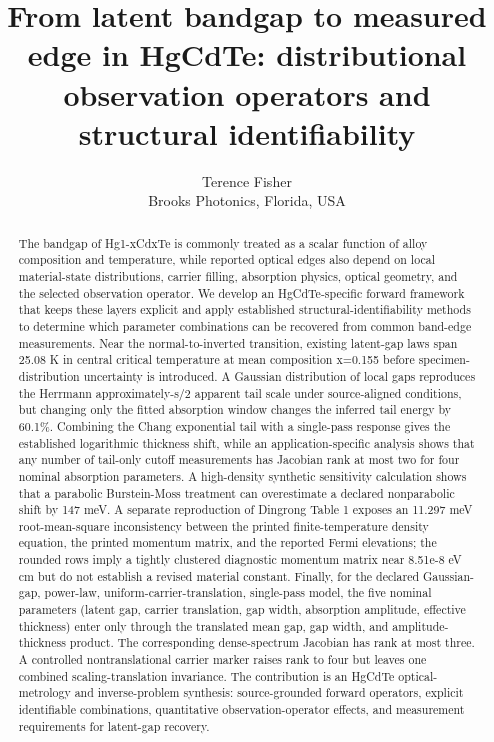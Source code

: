 \documentclass[12pt]{article}
\title{From latent bandgap to measured edge in HgCdTe: distributional observation operators and structural identifiability}
\author{Terence Fisher\\\small Brooks Photonics, Florida, USA}
\date{}
\begin{document}
\maketitle


\begin{abstract}

The bandgap of Hg1-xCdxTe is commonly treated as a scalar function of alloy composition and temperature, while reported optical edges also depend on local material-state distributions, carrier filling, absorption physics, optical geometry, and the selected observation operator. We develop an HgCdTe-specific forward framework that keeps these layers explicit and apply established structural-identifiability methods to determine which parameter combinations can be recovered from common band-edge measurements. Near the normal-to-inverted transition, existing latent-gap laws span 25.08 K in central critical temperature at mean composition x=0.155 before specimen-distribution uncertainty is introduced. A Gaussian distribution of local gaps reproduces the Herrmann approximately-s/2 apparent tail scale under source-aligned conditions, but changing only the fitted absorption window changes the inferred tail energy by 60.1\%. Combining the Chang exponential tail with a single-pass response gives the established logarithmic thickness shift, while an application-specific analysis shows that any number of tail-only cutoff measurements has Jacobian rank at most two for four nominal absorption parameters. A high-density synthetic sensitivity calculation shows that a parabolic Burstein-Moss treatment can overestimate a declared nonparabolic shift by 147 meV. A separate reproduction of Dingrong Table 1 exposes an 11.297 meV root-mean-square inconsistency between the printed finite-temperature density equation, the printed momentum matrix, and the reported Fermi elevations; the rounded rows imply a tightly clustered diagnostic momentum matrix near 8.51e-8 eV cm but do not establish a revised material constant. Finally, for the declared Gaussian-gap, power-law, uniform-carrier-translation, single-pass model, the five nominal parameters (latent gap, carrier translation, gap width, absorption amplitude, effective thickness) enter only through the translated mean gap, gap width, and amplitude-thickness product. The corresponding dense-spectrum Jacobian has rank at most three. A controlled nontranslational carrier marker raises rank to four but leaves one combined scaling-translation invariance. The contribution is an HgCdTe optical-metrology and inverse-problem synthesis: source-grounded forward operators, explicit identifiable combinations, quantitative observation-operator effects, and measurement requirements for latent-gap recovery.

\end{abstract}
\end{document}
